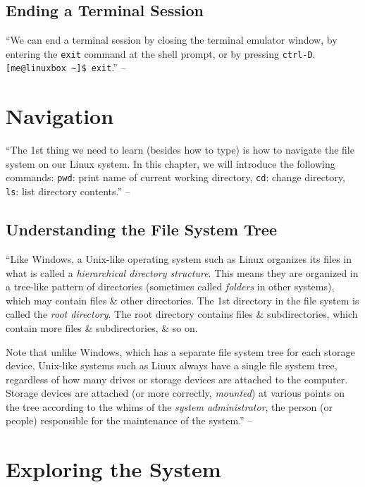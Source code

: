 \documentclass[oneside]{book}
\numberwithin{equation}{section}
\begin{document}
\subsection{Ending a Terminal Session}
``We can end a terminal session by closing the terminal emulator window, by entering the \texttt{exit} command at the shell prompt, or by pressing \texttt{ctrl-D}. \verb|[me@linuxbox ~]$ exit|.'' -- \cite[p. 42]{Shotts2019}


\section{Navigation}
``The 1st thing we need to learn (besides how to type) is how to navigate the file system on our Linux system. In this chapter, we will introduce the following commands: \texttt{pwd}: print name of current working directory, \texttt{cd}: change directory, \texttt{ls}: list directory contents.'' -- \cite[p. 43]{Shotts2019}

\subsection{Understanding the File System Tree}
``Like Windows, a Unix-like operating system such as Linux organizes its files in what is called a \textit{hierarchical directory structure}. This means they are organized in a tree-like pattern of directories (sometimes called \textit{folders} in other systems), which may contain files \& other directories. The 1st directory in the file system is called the \textit{root directory}. The root directory contains files \& subdirectories, which contain more files \& subdirectories, \& so on.

Note that unlike Windows, which has a separate file system tree for each storage device, Unix-like systems such as Linux always have a single file system tree, regardless of how many drives or storage devices are attached to the computer. Storage devices are attached (or more correctly, \textit{mounted}) at various points on the tree according to the whims of the \textit{system administrator}, the person (or people) responsible for the maintenance of the system.'' -- \cite[pp. 43--44]{Shotts2019}


\section{Exploring the System}
\end{document}
